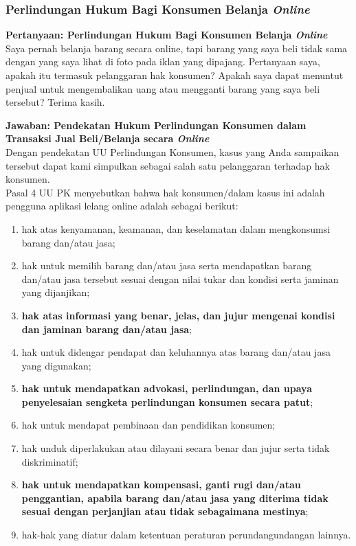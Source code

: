 \subsubsection{Perlindungan Hukum Bagi Konsumen Belanja \textit{Online}}

\textbf{Pertanyaan: Perlindungan Hukum Bagi Konsumen Belanja \textit{Online}} \\ 
\indent Saya pernah belanja barang secara online, tapi barang yang saya beli tidak sama dengan yang saya lihat di foto pada iklan yang dipajang. Pertanyaan saya, apakah itu termasuk pelanggaran hak konsumen? Apakah saya dapat menuntut penjual untuk mengembalikan uang atau mengganti barang yang saya beli tersebut? Terima kasih.


\textbf{Jawaban: Pendekatan Hukum Perlindungan Konsumen dalam Transaksi Jual Beli/Belanja secara \textit{Online}} \\ 
\indent Dengan pendekatan UU Perlindungan Konsumen, kasus yang Anda sampaikan tersebut dapat kami simpulkan sebagai salah satu pelanggaran terhadap hak konsumen. \\

\indent Pasal 4 UU PK menyebutkan bahwa hak konsumen/dalam kasus ini adalah pengguna aplikasi lelang online adalah sebagai berikut:
\begin{enumerate}
	\item hak atas kenyamanan, keamanan, dan keselamatan dalam mengkonsumsi barang dan/atau jasa;
	\item hak untuk memilih barang dan/atau jasa serta mendapatkan barang dan/atau jasa tersebut sesuai dengan nilai tukar dan kondisi serta jaminan yang dijanjikan;
	\item \textbf{hak atas informasi yang benar, jelas, dan jujur mengenai kondisi dan jaminan barang dan/atau jasa};
	\item hak untuk didengar pendapat dan keluhannya atas barang dan/atau jasa yang digunakan;
	\item \textbf{hak untuk mendapatkan advokasi, perlindungan, dan upaya penyelesaian sengketa perlindungan konsumen secara patut};
	\item hak untuk mendapat pembinaan dan pendidikan konsumen;
	\item hak unduk diperlakukan atau dilayani secara benar dan jujur serta tidak diskriminatif;
	\item \textbf{hak untuk mendapatkan kompensasi, ganti rugi dan/atau penggantian, apabila barang dan/atau jasa yang diterima tidak sesuai dengan perjanjian atau tidak sebagaimana mestinya};
	\item hak-hak yang diatur dalam ketentuan peraturan perundangundangan lainnya.
\end{enumerate} \ \\

